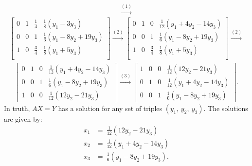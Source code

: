 \documentclass[12pt]{article}
\begin{document}
\begin{enumerate}
\begin{align*}
      \xrightarrow{(1)}
    \end{align*}
    \begin{align*}
      \begin{bmatrix}
        0 & 1 & \frac{1}{4}  & \frac{1}{8}(y_1 - 3y_3)\\
        0 & 0 & 1            & \frac{1}{6}(y_1 - 8y_2 + 19y_3)\\
        1 & 0 & \frac{3}{4}  & \frac{1}{8}(y_1 + 5y_3)\\
      \end{bmatrix}
      \xrightarrow{(2)}
      \begin{bmatrix}
        0 & 1 & 0            & \frac{1}{12}(y_1 + 4y_2 - 14y_3)\\
        0 & 0 & 1            & \frac{1}{6}(y_1 - 8y_2 + 19y_3)\\
        1 & 0 & \frac{3}{4}  & \frac{1}{8}(y_1 + 5y_3)\\
      \end{bmatrix}
      \xrightarrow{(2)}
    \end{align*}
    \begin{align*}
      \begin{bmatrix}
        0 & 1 & 0 & \frac{1}{12}(y_1 + 4y_2 - 14y_3)\\
        0 & 0 & 1 & \frac{1}{6}(y_1 - 8y_2 + 19y_3)\\
        1 & 0 & 0 & \frac{1}{12}(12y_2 - 21y_3)
      \end{bmatrix}
      \xrightarrow{(3)}
      \begin{bmatrix}
        1 & 0 & 0 & \frac{1}{12}(12y_2 - 21y_3)\\
        0 & 1 & 0 & \frac{1}{12}(y_1 + 4y_2 - 14y_3)\\
        0 & 0 & 1 & \frac{1}{6}(y_1 - 8y_2 + 19y_3)
      \end{bmatrix}.
    \end{align*}
    In truth, $AX = Y$ has a solution for any set of triples
    $(y_1,\ y_2,\ y_3)$. The solutions are given by:
    \begin{align*}
      x_1 &=\ \frac{1}{12}(12y_2 - 21y_3)\\
      x_2 &=\ \frac{1}{12}(y_1 + 4y_2 - 14y_3)\\
      x_3 &=\ \frac{1}{6}(y_1 - 8y_2 + 19y_3).
    \end{align*}
\end{enumerate}
\end{document}
